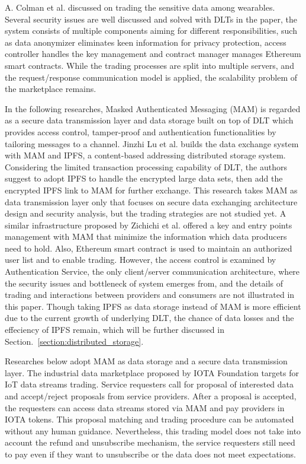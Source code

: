 \documentclass[conference]{IEEEtran}
\begin{document}
A. Colman et al. \cite{TrustedMarketplaceWearable} discussed on trading the sensitive data among wearables. Several security issues are well discussed and solved with DLTs in the paper, the system consists of multiple components aiming for different responsibilities, such as data anonymizer eliminates keen information for privacy protection, access controller handles the key management and contract manager manages Ethereum smart contracts. While the trading processes are split into multiple servers, and the request/response communication model is applied, the scalability problem of the marketplace remains.

In the following researches, Masked Authenticated Messaging (MAM)\cite{MAM} is regarded as a secure data transmission layer and data storage built on top of DLT which provides access control, tamper-proof and authentication functionalities by tailoring messages to a channel. Jinzhi Lu et al.\cite{luDecentralizedDM} builds the data exchange system with MAM and IPFS\cite{IPFS}, a content-based addressing distributed storage system. Considering the limited transaction processing capability of DLT, the authors suggest to adopt IPFS to handle the encrypted large data sets, then add the encrypted IPFS link to MAM for further exchange. This research takes MAM as data transmission layer only that focuses on secure data exchanging architecture design and security analysis, but the trading strategies are not studied yet. A similar infrastructure proposed by Zichichi et al.\cite{SocialGood} offered a key and entry points management with MAM that minimize the information which data producers need to hold. Also, Ethereum smart contract is used to maintain an authorized user list and to enable trading. However, the access control is examined by Authentication Service, the only client/server communication architecture, where the security issues and bottleneck of system emerges from, and the details of trading and interactions between providers and consumers are not illustrated in this paper. Though taking IPFS as data storage instead of MAM is more efficient due to the current growth of underlying DLT, the chance of data losses and the effeciency of IPFS remain, which will be further discussed in Section.~\ref{section:distributed_storage}. 

Researches below adopt MAM as data storage and a secure data transmission layer. The industrial data marketplace\cite{IOTAIdustryMarketplace} proposed by IOTA Foundation targets for IoT data streams trading. Service requesters call for proposal of interested data and accept/reject proposals from service providers. After a proposal is accepted, the requesters can access data streams stored via MAM and pay providers in IOTA tokens. This proposal matching and trading procedure can be automated without any human guidance\cite{IOTAIdustryMarketplaceWithoutHuman}. Nevertheless, this trading model does not take into account the refund and unsubscribe mechanism, the service requesters still need to pay even if they want to unsubscribe or the data does not meet expectations.
\end{document}

